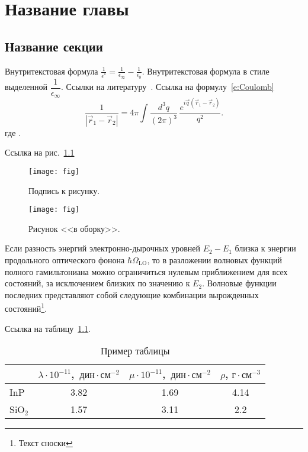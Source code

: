 \chapter{Название главы}
\section{Название секции}

Внутритекстовая формула $\frac{1}{\epsilon^*}=\frac{1}{\epsilon_\infty}-\frac{1}{\epsilon_0}$.
Внутритекстовая формула в стиле выделенной $\dfrac{1}{\epsilon_\infty}$.
Ссылки на литературу~\cite{Yoffe_1993_AP_42_173,Efros_1982_FTP_16_7_1209,%
Anselm_1978,Segall_1968,Agranovich_1983,InP,Mishchenko_1996,Skvortsov_2008,%
Perelman_2003_math:0307245,Nielsen_2010_1006.2735,patent1,patent2}.
Ссылка на формулу~\eqref{e:Coulomb}
\begin{equation}\label{e:Coulomb}
  \frac{1}{|\vec r_1 - \vec r_2|} =
  4\pi \int \frac{d^3 q}{(2\pi)^3}\,
  \frac{e^{i\vec q(\vec r_1 - \vec r_2)}}{q^2}.
\end{equation}
где .

Ссылка на рис.~\ref{f:fig}
\begin{figure}[!ht]
  \centering
  \texttt{[image: fig]}
  \caption{\label{f:fig}%
  Подпись к рисунку.
  }
\end{figure}

\begin{wrapfigure}{r}{0.35\textwidth}
\centering
\texttt{[image: fig]}
\caption{\label{f:ff}%
Рисунок <<в оборку>>.
}
\end{wrapfigure}

Если разность энергий электронно-дырочных уровней $E_2 - E_1$ близка к энергии продольного оптического фонона $\hbar\Omega_{\mathrm{LO}}$, то в разложении волновых функций полного гамильтониана можно ограничиться нулевым приближением для всех состояний, за исключением близких по значению к $E_2$.
Волновые функции последних представляют собой следующие комбинации вырожденных состояний\footnote{Текст сноски}.

Ссылка на таблицу~\ref{t:InPSiO2}.
\begin{table}[!ht]
  \centering
  \caption{Пример таблицы}\label{t:InPSiO2}
  \begin{tabular}{l|ccc}
    \hline\hline
    & \quad$\lambda \cdot 10^{-11}$,~$\text{дин}\cdot\text{см}^{-2}$
    & \quad$\mu \cdot 10^{-11}$,~$\text{дин}\cdot\text{см}^{-2}$
    & \quad$\rho$, $\text{г}\cdot\text{см}^{-3}$ \\
    \hline
    InP       & 3.82 & 1.69 & 4.14 \\
    SiO$_{2}$ & 1.57 & 3.11 & 2.2  \\
    \hline\hline
  \end{tabular}
\end{table}

